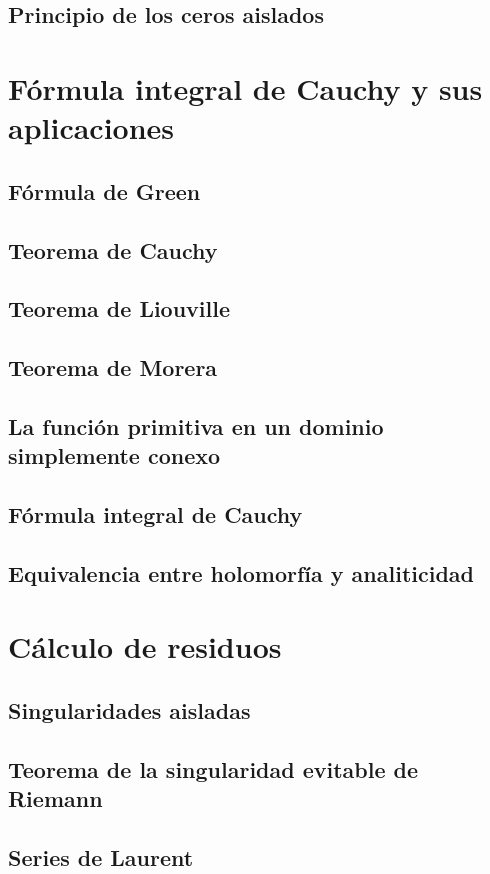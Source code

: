 \documentclass{apuntes}
\begin{document}
\section{Principio de los ceros aislados}


\chapter{Fórmula integral de Cauchy y sus aplicaciones}
\section{Fórmula de Green}
\section{Teorema de Cauchy}
\section{Teorema de Liouville}
\section{Teorema de Morera}
\section{La función primitiva en un dominio simplemente conexo}
\section{Fórmula integral de Cauchy}
\section{Equivalencia entre holomorfía y analiticidad}


\chapter{Cálculo de residuos}
\section{Singularidades aisladas}
\section{Teorema de la singularidad evitable de Riemann}
\section{Series de Laurent}
\end{document}
